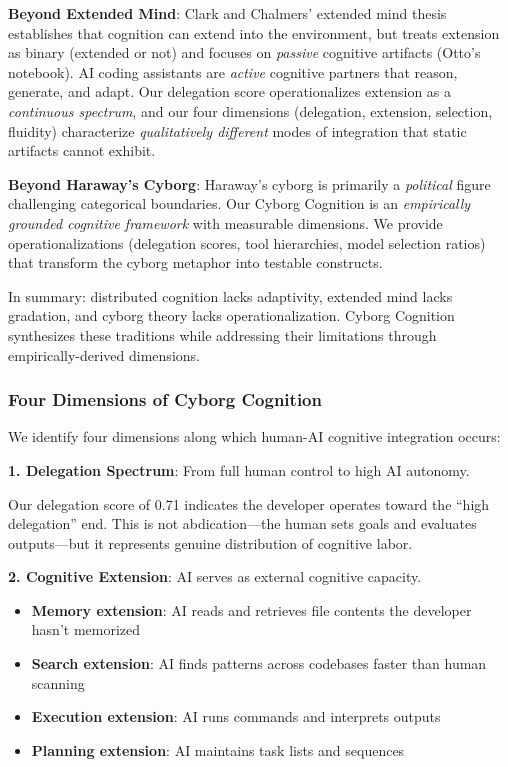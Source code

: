 \documentclass{ntlabs-preprint}
\begin{document}
\textbf{Beyond Extended Mind}: Clark and Chalmers' \citep{clark1998extended} extended mind thesis establishes that cognition can extend into the environment, but treats extension as binary (extended or not) and focuses on \textit{passive} cognitive artifacts (Otto's notebook). AI coding assistants are \textit{active} cognitive partners that reason, generate, and adapt. Our delegation score operationalizes extension as a \textit{continuous spectrum}, and our four dimensions (delegation, extension, selection, fluidity) characterize \textit{qualitatively different} modes of integration that static artifacts cannot exhibit.

\textbf{Beyond Haraway's Cyborg}: Haraway's cyborg is primarily a \textit{political} figure challenging categorical boundaries. Our Cyborg Cognition is an \textit{empirically grounded cognitive framework} with measurable dimensions. We provide operationalizations (delegation scores, tool hierarchies, model selection ratios) that transform the cyborg metaphor into testable constructs.

In summary: distributed cognition lacks adaptivity, extended mind lacks gradation, and cyborg theory lacks operationalization. Cyborg Cognition synthesizes these traditions while addressing their limitations through empirically-derived dimensions.

\subsubsection{Four Dimensions of Cyborg Cognition}

We identify four dimensions along which human-AI cognitive integration occurs:

\textbf{1. Delegation Spectrum}: From full human control to high AI autonomy.

Our delegation score of 0.71 indicates the developer operates toward the ``high delegation'' end. This is not abdication---the human sets goals and evaluates outputs---but it represents genuine distribution of cognitive labor.

\textbf{2. Cognitive Extension}: AI serves as external cognitive capacity.

\begin{itemize}
    \item \textbf{Memory extension}: AI reads and retrieves file contents the developer hasn't memorized
    \item \textbf{Search extension}: AI finds patterns across codebases faster than human scanning
    \item \textbf{Execution extension}: AI runs commands and interprets outputs
    \item \textbf{Planning extension}: AI maintains task lists and sequences
\end{itemize}
\end{document}

